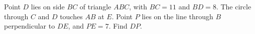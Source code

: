 Point $D$ lies on side $BC$ of triangle $ABC$, with $BC=11$ and $BD=8$. The circle through $C$ and $D$ touches $AB$ at $E$. Point $P$ lies on the line through $B$ perpendicular to $DE$, and $PE=7$. Find $DP$.
